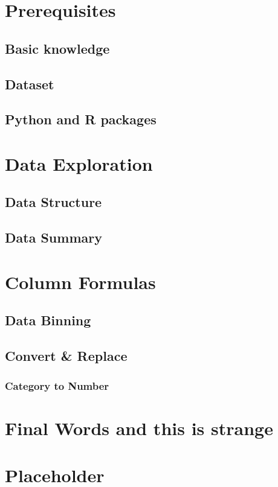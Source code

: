 \documentclass[12pt,]{book}
\begin{document}
\chapter{Prerequisites}\label{prerequisites}

\section{Basic knowledge}\label{basic-knowledge}

\section{Dataset}\label{dataset}

\section{Python and R packages}\label{python-and-r-packages}

\chapter{Data Exploration}\label{data-exploration}

\section{Data Structure}\label{data-structure}

\section{Data Summary}\label{data-summary}

\chapter{Column Formulas}\label{column-formulas}

\section{Data Binning}\label{data-binning}

\section{Convert \& Replace}\label{convert-replace}

\subsection{Category to Number}\label{category-to-number}

\chapter{Final Words and this is
strange}\label{final-words-and-this-is-strange}

\chapter{Placeholder}\label{placeholder}


\end{document}
